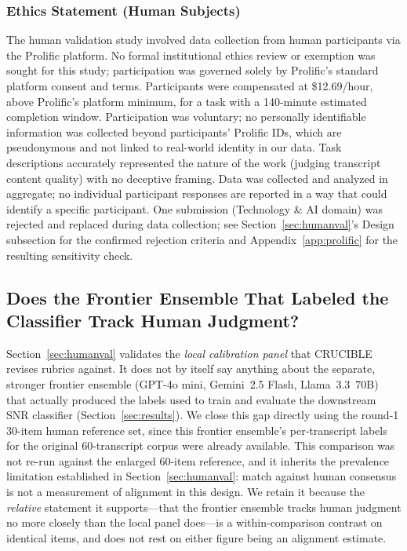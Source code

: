 \documentclass[11pt]{article}
\begin{document}
\subsubsection{Ethics Statement (Human Subjects)}

The human validation study involved data collection from human participants
via the Prolific platform. No formal institutional ethics review or
exemption was sought for this study; participation was governed solely by
Prolific's standard platform consent and terms. Participants were
compensated at \$12.69/hour, above Prolific's platform minimum, for a task
with a 140-minute estimated completion window. Participation was voluntary;
no personally identifiable information was collected beyond participants'
Prolific IDs, which are pseudonymous and not linked to real-world identity
in our data. Task descriptions accurately represented the nature of the
work (judging transcript content quality) with no deceptive framing. Data
was collected and analyzed in aggregate; no individual participant
responses are reported in a way that could identify a specific participant.
One submission (Technology \& AI domain) was rejected and replaced during
data collection; see Section~\ref{sec:humanval}'s Design subsection for the
confirmed rejection criteria and Appendix~\ref{app:prolific} for the
resulting sensitivity check.

\subsection{Does the Frontier Ensemble That Labeled the Classifier Track Human Judgment?}
\label{sec:frontierhuman}

Section~\ref{sec:humanval} validates the \emph{local calibration panel}
that CRUCIBLE revises rubrics against. It does not by itself say anything
about the separate, stronger frontier ensemble (GPT-4o mini, Gemini~2.5
Flash, Llama~3.3~70B) that actually produced the labels used to train and
evaluate the downstream SNR classifier (Section~\ref{sec:results}). We
close this gap directly using the round-1 30-item human reference set,
since this frontier ensemble's per-transcript labels for the original
60-transcript corpus were already available. This comparison was not
re-run against the enlarged 60-item reference, and it inherits the
prevalence limitation established in Section~\ref{sec:humanval}: match
against human consensus is not a measurement of alignment in this design.
We retain it because the \emph{relative} statement it supports---that the
frontier ensemble tracks human judgment no more closely than the local
panel does---is a within-comparison contrast on identical items, and does
not rest on either figure being an alignment estimate.
\end{document}
